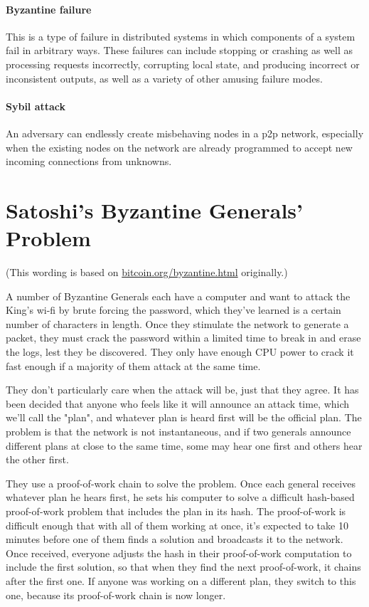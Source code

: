 \documentclass[letterpaper]{article}
\begin{document}
\paragraph{Byzantine failure} This is a type of failure in distributed systems
in which components of a system fail in arbitrary ways. These failures can
include stopping or crashing as well as processing requests incorrectly,
corrupting local state, and producing incorrect or inconsistent outputs, as
well as a variety of other amusing failure modes.

\paragraph{Sybil attack} An adversary can endlessly create misbehaving nodes in
a p2p network, especially when the existing nodes on the network are already
programmed to accept new incoming connections from unknowns.

\section{Satoshi's Byzantine Generals' Problem}

(This wording is based on \url{bitcoin.org/byzantine.html} originally.)

A number of Byzantine Generals each have a computer and want to attack the
King's wi-fi by brute forcing the password, which they've learned is a certain
number of characters in length. Once they stimulate the network to generate a
packet, they must crack the password within a limited time to break in and
erase the logs, lest they be discovered. They only have enough CPU power to
crack it fast enough if a majority of them attack at the same time.

They don't particularly care when the attack will be, just that they agree. It
has been decided that anyone who feels like it will announce an attack time,
which we'll call the "plan", and whatever plan is heard first will be the
official plan. The problem is that the network is not instantaneous, and if two
generals announce different plans at close to the same time, some may hear one
first and others hear the other first.

They use a proof-of-work chain to solve the problem. Once each general receives
whatever plan he hears first, he sets his computer to solve a difficult
hash-based proof-of-work problem that includes the plan in its hash. The
proof-of-work is difficult enough that with all of them working at once, it's
expected to take 10 minutes before one of them finds a solution and broadcasts
it to the network. Once received, everyone adjusts the hash in their
proof-of-work computation to include the first solution, so that when they find
the next proof-of-work, it chains after the first one. If anyone was working on
a different plan, they switch to this one, because its proof-of-work chain is
now longer.
\end{document}
